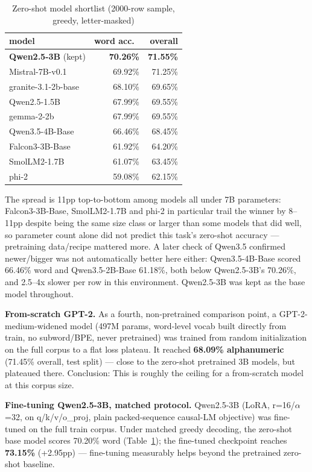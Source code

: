 \documentclass[11pt,conference]{IEEEtran}
\begin{document}
\begin{table}[h]
\centering
\caption{Zero-shot model shortlist (2000-row sample, greedy, letter-masked)}
\label{tab:shortlist}
\begin{tabular}{lrr}
\toprule
model & word acc.\ & overall \\
\midrule
\textbf{Qwen2.5-3B} (kept) & \textbf{70.26\%} & \textbf{71.55\%} \\
Mistral-7B-v0.1 & 69.92\% & 71.25\% \\
granite-3.1-2b-base & 68.10\% & 69.65\% \\
Qwen2.5-1.5B & 67.99\% & 69.55\% \\
gemma-2-2b & 67.99\% & 69.55\% \\
Qwen3.5-4B-Base & 66.46\% & 68.45\% \\
Falcon3-3B-Base & 61.92\% & 64.20\% \\
SmolLM2-1.7B & 61.07\% & 63.45\% \\
phi-2 & 59.08\% & 62.15\% \\
\bottomrule
\end{tabular}
\end{table}

The spread is 11pp top-to-bottom among models all under 7B parameters:
Falcon3-3B-Base, SmolLM2-1.7B and phi-2 in particular trail the winner by
8--11pp despite being the same size class or larger than some models that did
well, so parameter count alone did not predict this task's zero-shot
accuracy --- pretraining data/recipe mattered more. A later check of Qwen3.5
confirmed newer/bigger was not automatically better here either:
Qwen3.5-4B-Base scored 66.46\% word and Qwen3.5-2B-Base 61.18\%, both below
Qwen2.5-3B's 70.26\%, and 2.5--4x slower per row in this environment. Qwen2.5-3B
was kept as the base model throughout.


\textbf{From-scratch GPT-2.} As a fourth, non-pretrained comparison point, a
GPT-2-medium-widened model (497M params, word-level vocab built directly from
train, no subword/BPE, never pretrained) was trained from random
initialization on the full corpus to a
flat loss plateau. It reached \textbf{68.09\% alphanumeric} (71.45\% overall,
test split) --- close to the zero-shot pretrained 3B models, but plateaued there. 
Conclusion: This is roughly the ceiling for a from-scratch model at this corpus size.

\textbf{Fine-tuning Qwen2.5-3B, matched protocol.} Qwen2.5-3B (LoRA,
r=16/$\alpha$=32, on q/k/v/o\_proj, plain packed-sequence causal-LM
objective) was fine-tuned on the full train corpus. Under matched greedy
decoding, the zero-shot base model scores 70.20\% word
(Table~\ref{tab:shortlist}); the fine-tuned checkpoint reaches
\textbf{73.15\%} (+2.95pp) --- fine-tuning measurably helps beyond the
pretrained zero-shot baseline.
\end{document}
